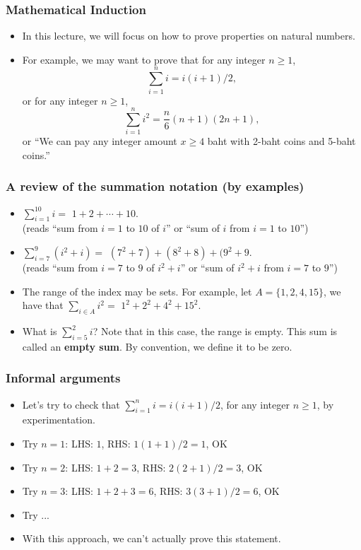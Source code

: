 

\begin{frame}\frametitle{Mathematical Induction}
  \begin{itemize}
  \item In this lecture, we will focus on how to prove properties on natural numbers. \pause
  \item For example, we may want to prove that for any integer $n\geq 1$,
    \[ \sum_{i=1}^n i = i(i+1)/2, \]
    \pause
    or for any integer $n\geq 1$,
    \[ \sum_{i=1}^n i^2 = \frac{n}{6}(n+1)(2n+1),\]
    \pause
    or ``We can pay any integer amount $x\geq 4$ baht with 2-baht
    coins and 5-baht coins.''
  \end{itemize}
\end{frame}

\begin{frame}\frametitle{A review of the summation notation (by examples)}
  \begin{itemize}
  \item $\displaystyle\sum_{i=1}^{10} i =$ \pause $1+2+\cdots+10.$ \\ \pause (reads ``sum from
    $i=1$ to $10$ of $i$'' or ``sum of $i$ from $i=1$ to $10$'') \pause
  \item $\displaystyle\sum_{i=7}^{9} (i^2+i) =$ \pause $(7^2+7)+(8^2+8)+(9^2+9.$ \\ \pause (reads ``sum from $i=7$ to $9$ of $i^2 + i$'' or ``sum of $i^2+i$ from $i=7$ to $9$'') \pause
  \item The range of the index may be sets.  For example, let
    $A=\{1,2,4,15\}$, we have that $\displaystyle\sum_{i\in A} i^2 =$ \pause $1^2+2^2+4^2+15^2$.
    \pause
  \item What is $\sum_{i=5}^{2} i$? \pause Note that in this case, the
    range is empty.  This sum is called an {\bf empty sum}.  By
    convention, we define it to be zero.
  \end{itemize}
\end{frame}

\begin{frame}\frametitle{Informal arguments}
  \begin{itemize}
  \item Let's try to check that $\sum_{i=1}^n i = i(i+1)/2$, for any
    integer $n\geq 1$, by experimentation.
  \item Try $n=1$: \pause LHS: $1$, \pause RHS: $1(1+1)/2 = 1$, \pause OK
  \item Try $n=2$: \pause LHS: $1+2=3$, \pause RHS: $2(2+1)/2 = 3$, \pause OK
  \item Try $n=3$: \pause LHS: $1+2+3=6$, \pause RHS: $3(3+1)/2 = 6$, \pause OK
  \item Try ... \pause
  \item With this approach, we can't actually prove this statement.
  \end{itemize}
\end{frame}

